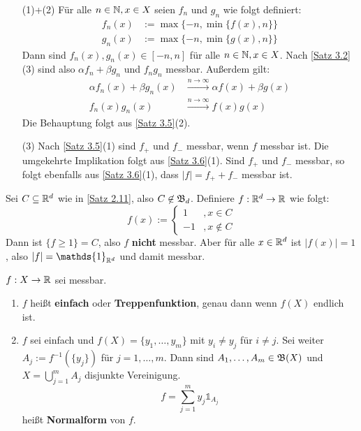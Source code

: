 \documentclass[a4paper,twoside,DIV15,BCOR12mm,chapterprefix=true,headings=onelinechapter]{scrbook}
\begin{document}
\begin{beweis}
\begin{enumerate}
\item[(1)+(2)] Für alle $n\in\mathbb{N}, x\in X$ seien $f_n$ und $g_n$ wie folgt definiert:
\begin{align*}
f_n(x)&:=\max\{-n,\min\{f(x),n\}\}\\
g_n(x)&:=\max\{-n,\min\{g(x),n\}\}
\end{align*}
Dann sind $f_n(x),g_n(x)\in[-n,n]$ für alle $n\in\mathbb{N},x\in X$. Nach \ref{Satz 3.2}(3) sind also $\alpha f_n+\beta g_n$ und $f_ng_n$ messbar. Außerdem gilt:
\begin{align*}
\alpha f_n(x)+\beta g_n(x)&\stackrel{n\to\infty}\to \alpha f(x)+\beta g(x)\\
f_n(x)g_n(x)&\stackrel{n\to\infty}\to f(x)g(x)
\end{align*}
Die Behauptung folgt aus \ref{Satz 3.5}(2).
\item[(3)] Nach \ref{Satz 3.5}(1) sind $f_+$ und $f_-$ messbar, wenn $f$ messbar ist. Die umgekehrte Implikation folgt aus \ref{Satz 3.6}(1). Sind $f_+$ und $f_-$ messbar, so folgt ebenfalls aus \ref{Satz 3.6}(1), dass $|f|=f_++f_-$ messbar ist.
\end{enumerate}
\end{beweis}

\begin{beispiel}
Sei $C\subseteq\mathbb{R}^d$ wie in \ref{Satz 2.11}, also $C\not\in\mathfrak{B}_d$. Definiere $f:\mathbb{R}^d\to\mathbb{R}$ wie folgt:
\[f(x):=\begin{cases} 1&,x\in C\\ -1&,x\not\in C\end{cases}\]
Dann ist $\{f\ge 1\}=C$, also $f$ \textbf{nicht} messbar. Aber für alle $x\in\mathbb{R}^d$ ist $|f(x)|=1$, also $|f|=\mathds{1}_{\mdr^d}$ und damit messbar.
\end{beispiel}

\begin{definition}
$f:X\to\mathbb{R}$ sei messbar.
\begin{enumerate}
\item $f$ heißt \textbf{einfach} oder \textbf{Treppenfunktion}, genau dann wenn $f(X)$ endlich ist.
\item $f$ sei einfach und $f(X)=\{y_1,\ldots,y_m\}$ mit $y_i\ne y_j$ für $i\ne j$. Sei weiter $A_j:=f^{-1}(\{y_j\})$ für $j=1,\ldots,m$. Dann sind $A_1,\ldots,A_m\in\mathfrak{B}(X)$ und $X=\bigcup_{j=1}^m A_j$ disjunkte Vereinigung.
\[f=\sum_{j=1}^m y_j \mathds{1}_{A_j}\]
heißt \textbf{Normalform} von $f$.
\end{enumerate}
\end{definition}
\end{document}
